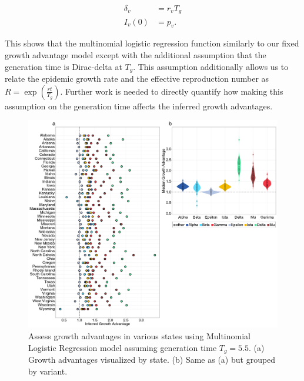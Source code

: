 \documentclass[12pt]{article}
\begin{document}
\begin{align}
  \delta_{v} &= r_{v}T_{g}\\
  I_{v}(0) &= p_{v}.
\end{align}

This shows that the multinomial logistic regression function similarly to our fixed growth advantage model except with the additional assumption that the generation time is Dirac-delta at $T_{g}$.
This assumption additionally allows us to relate the epidemic growth rate and the effective reproduction number as $R = \exp(\frac{rt}{T_{g}})$. \cite{Wallinga2006}
Further work is needed to directly quantify how making this assumption on the generation time affects the inferred growth advantages.

\begin{figure}
  \centering
  \includegraphics[width=\linewidth]{figs/fig_MLR_growth_advantages_supp.png}
  \caption{Assess growth advantages in various states using Multinomial Logistic Regression model assuming generation time $T_{g} = 5.5$.
  (a) Growth advantages visualized by state.
  (b) Same as (a) but grouped by variant.}%
  \label{fig:MLR_growth_advantages}
\end{figure}


\end{document}
